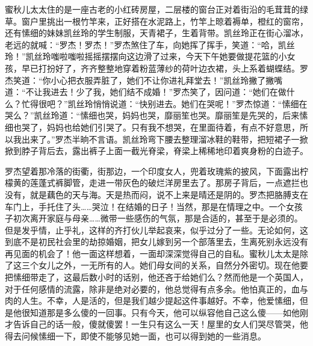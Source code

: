 \par 蜜秋儿太太住的是一座古老的小红砖房屋，二层楼的窗台正对着街沿的毛茸茸的绿草。窗户里挑出一根竹竿来，正好搭在水泥路上，竹竿上晾着褥单，橙红的窗帘，还有愫细的妹妹凯丝玲的学生制服，天青裙子，生着背带。凯丝玲正在街心溜冰，老远的就喊：“罗杰！罗杰！”罗杰煞住了车，向她挥了挥手，笑道：“哈，凯丝玲！”凯丝玲嗤啦嗤啦摇摇摆摆向这边滑了过来，今天下午她要做提花篮的小女孩，早已打扮好了，齐齐整整地穿着粉蓝薄纱的荷叶边衣裙，头上系着蝴蝶结。罗杰笑道：“你小心把衣服弄脏了，她们不让你进礼拜堂去！”凯丝玲撇了撇嘴道：“不让我进去！少了我，她们结不成婚！”罗杰笑了，因问道：“她们在做什么？忙得很吧？”凯丝玲悄悄说道：“快别进去。她们在哭呢！”罗杰惊道：“愫细在哭么？”凯丝玲道：“愫细也哭，妈妈也哭，靡丽笙也哭。靡丽笙是先哭的，后来愫细也哭了，妈妈也给她们引哭了。只有我不想哭，在里面待着，有点不好意思，所以我出来了。”罗杰半晌不言语。凯丝玲弯下腰去整理溜冰鞋的鞋带，把短裙子一掀掀到脖子背后去，露出裤子上面一截光脊梁，脊梁上稀稀地印着爽身粉的白迹子。
\par 罗杰望着那冷落的街衢，街那边，一个印度女人，兜着玫瑰紫的披风，下面露出柠檬黄的莲蓬式裤脚管，走进一带灰色的破烂洋房里去了。那房子背后，一点遮拦也没有，就是藕色的天与海。天是热而闷，说不上来是晴还是阴的。罗杰把胳膊支在车门上，手托住了头……哭泣！在结婚的日子！当然，那是在情理之中。一个女孩子初次离开家庭与母亲……微带一些感伤的气氛，那是合适的，甚至于是必须的。但是发乎情，止乎礼，这样的齐打伙儿举起哀来，似乎过分了一些。无论如何，这到底不是初民社会里的劫掠婚姻，把女儿嫁到另一个部落里去，生离死别永远没有再见面的机会了！他一面这样想着，一面却深深觉得自己的自私。蜜秋儿太太是除了这三个女儿之外，一无所有的人。她们母女间的关系，自然分外密切。现在他要把愫细带走了，这最后数小时的话别，他还吝于给她们么？然而他是一个英国人，对于任何感情的流露，除非是绝对必要的，他总觉得有点多余。他怕真正的，血与肉的人生。不幸，人是活的，但是我们越少提起这件事越好。不幸，他爱愫细，但是他很知道那是多么傻的一回事。只有今天，他可以纵容他自己这么傻——如他刚才告诉自己的话一般，傻就傻罢！一生只有这么一天！屋里的女人们哭尽管哭，他得去问候愫细一下，即使不能够见她一面，也可以得到她的一些消息。
